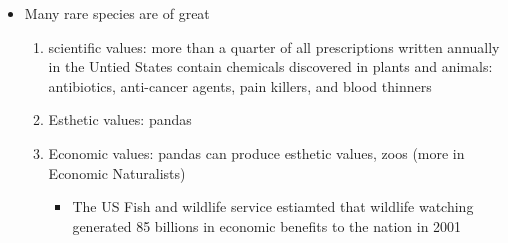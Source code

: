 \documentclass{article}
\begin{document}
      \begin{itemize}
        \item Many rare species are of great
        \begin{enumerate}
          \item scientific values: more than a quarter of all prescriptions
          written annually in the Untied States contain chemicals discovered
          in plants and animals: antibiotics, anti-cancer agents, pain killers,
          and blood thinners
          \item Esthetic values: pandas
          \item Economic values: pandas can produce esthetic values, zoos
          (more in Economic Naturalists)
          \begin{itemize}
            \item The US Fish and wildlife service estiamted that wildlife
            watching generated 85 billions in economic benefits to the
            nation in 2001
          \end{itemize}
        \end{enumerate}
      \end{itemize}
\end{document}
